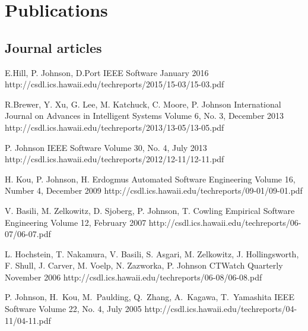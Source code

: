 \documentclass[11pt,letterpaper,sans]{moderncv} %
\begin{document}
\section{Publications}
\subsection{Journal articles}

          {E.Hill,  P. Johnson, D.Port}
          {IEEE Software}
          {January 2016}
          {http://csdl.ics.hawaii.edu/techreports/2015/15-03/15-03.pdf}


          {R.Brewer, Y. Xu, G. Lee, M. Katchuck, C. Moore, P. Johnson}
          {International Journal on Advances in Intelligent Systems}
          {Volume 6, No. 3, December 2013}
          {http://csdl.ics.hawaii.edu/techreports/2013/13-05/13-05.pdf}

          {P. Johnson}
          {IEEE Software}
          {Volume 30, No. 4, July 2013}
          {http://csdl.ics.hawaii.edu/techreports/2012/12-11/12-11.pdf}

          {H. Kou, P. Johnson, H. Erdogmus}
          {Automated Software Engineering}
          {Volume 16, Number 4, December 2009}
          {http://csdl.ics.hawaii.edu/techreports/09-01/09-01.pdf}

          {V. Basili, M. Zelkowitz, D. Sjoberg, P. Johnson, T. Cowling}
          {Empirical Software Engineering}
          {Volume 12, February 2007}
          {http://csdl.ics.hawaii.edu/techreports/06-07/06-07.pdf}

          {L. Hochstein, T. Nakamura, V. Basili, S. Asgari, M. Zelkowitz, J. Hollingsworth, F. Shull, J. Carver, M. Voelp, N. Zazworka, P. Johnson}
          {CTWatch Quarterly}
          {November 2006}
          {http://csdl.ics.hawaii.edu/techreports/06-08/06-08.pdf}

          {P. Johnson, H.~Kou, M.~Paulding, Q.~Zhang, A.~Kagawa, T.~Yamashita}
          {IEEE Software}
          {Volume 22, No. 4, July 2005}
          {http://csdl.ics.hawaii.edu/techreports/04-11/04-11.pdf}
\end{document}
